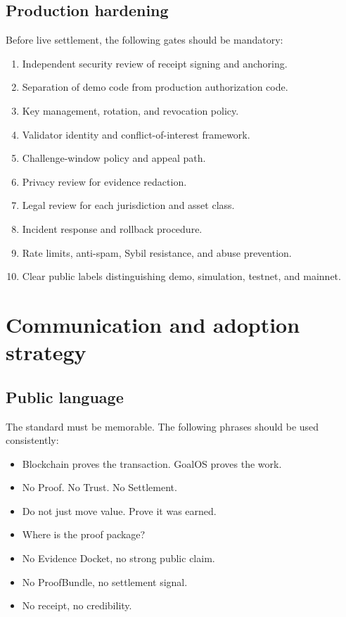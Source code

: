 \documentclass[11pt]{article}
\begin{document}
\subsection{Production hardening}

Before live settlement, the following gates should be mandatory:

\begin{enumerate}
  \item Independent security review of receipt signing and anchoring.
  \item Separation of demo code from production authorization code.
  \item Key management, rotation, and revocation policy.
  \item Validator identity and conflict-of-interest framework.
  \item Challenge-window policy and appeal path.
  \item Privacy review for evidence redaction.
  \item Legal review for each jurisdiction and asset class.
  \item Incident response and rollback procedure.
  \item Rate limits, anti-spam, Sybil resistance, and abuse prevention.
  \item Clear public labels distinguishing demo, simulation, testnet, and mainnet.
\end{enumerate}

\section{Communication and adoption strategy}

\subsection{Public language}

The standard must be memorable. The following phrases should be used consistently:

\begin{itemize}
  \item Blockchain proves the transaction. GoalOS proves the work.
  \item No Proof. No Trust. No Settlement.
  \item Do not just move value. Prove it was earned.
  \item Where is the proof package?
  \item No Evidence Docket, no strong public claim.
  \item No ProofBundle, no settlement signal.
  \item No receipt, no credibility.
\end{itemize}
\end{document}
